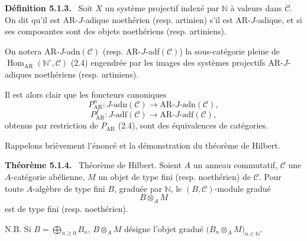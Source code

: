 \documentclass[11pt]{article}
\newenvironment{statement}[1]{\par\medskip\noindent\textbf{#1.}\ }{\par\medskip}
\DeclareMathOperator{\Hom}{Hom}
\providecommand{\Hom}{\operatorname{Hom}}
\begin{document}
\begin{statement}{Définition 5.1.3}
Soit \(X\) un système projectif indexé par \(\mathbb N\) à valeurs dans \(\mathcal C\). On dit qu'il est AR-\(J\)-adique noethérien (resp. artinien) s'il est AR-\(J\)-adique, et si ses composantes sont des objets noethériens (resp. artiniens).
\end{statement}

On notera AR-\(J\)-adn\((\mathcal C)\) (resp. AR-\(J\)-adf\((\mathcal C)\)) la sous-catégorie pleine de \(\Hom_{\mathrm{AR}}(\mathbb N^\circ,\mathcal C)\) (2.4) engendrée par les images des systèmes projectifs AR-\(J\)-adiques noethériens (resp. artiniens).

Il est alors clair que les foncteurs canoniques
\[
P^n_{\mathrm{AR}}:J\text{-adn}(\mathcal C)\longrightarrow \mathrm{AR}\text{-}J\text{-adn}(\mathcal C),
\]
\[
P^f_{\mathrm{AR}}:J\text{-adf}(\mathcal C)\longrightarrow \mathrm{AR}\text{-}J\text{-adf}(\mathcal C),
\]
obtenus par restriction de \(P_{\mathrm{AR}}\) (2.4), sont des équivalences de catégories.

Rappelons brièvement l'énoncé et la démonstration du théorème de Hilbert.

\begin{statement}{Théorème 5.1.4}
Théorème de Hilbert. Soient \(A\) un anneau commutatif, \(\mathcal C\) une \(A\)-catégorie abélienne, \(M\) un objet de type fini (resp. noethérien) de \(\mathcal C\). Pour toute \(A\)-algèbre de type fini \(B\), graduée par \(\mathbb N\), le \((B,\mathcal C)\)-module gradué
\[
B\otimes_A M
\]
est de type fini (resp. noethérien).

N.B. Si \(B=\bigoplus_{n\ge0}B_n\), \(B\otimes_A M\) désigne l'objet gradué \(\bigl(B_n\otimes_A M\bigr)_{n\in\mathbb N}\).
\end{statement}
\end{document}
